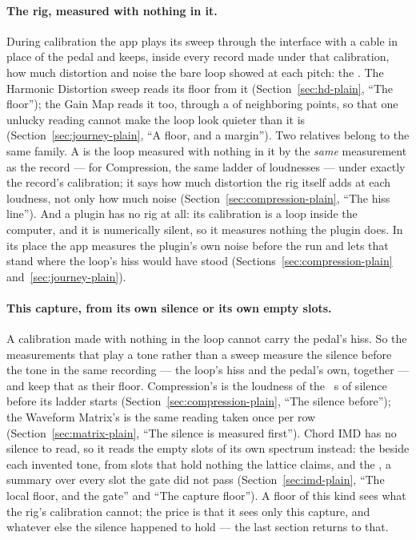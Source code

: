 \documentclass[11pt,a4paper]{article}
\begin{document}
\paragraph{The rig, measured with nothing in it.} During calibration the
app plays its sweep through the interface with a cable in place of the
pedal and keeps, inside every record made under that calibration, how much
distortion and noise the bare loop showed at each pitch: the
. The Harmonic Distortion sweep reads its floor from it
(Section~\ref{sec:hd-plain}, ``The floor''); the Gain Map reads it too,
through a  of \gmStampMedianPoints{} neighboring
points, so that one unlucky reading cannot make the loop look quieter
than it is (Section~\ref{sec:journey-plain}, ``A floor, and a margin'').
Two relatives belong to the same family. A  is
the loop measured with nothing in it by the \emph{same} measurement as
the record --- for Compression, the same ladder of loudnesses --- under
exactly the record's calibration; it says how much distortion the rig
itself adds at each loudness, not only how much noise
(Section~\ref{sec:compression-plain}, ``The hiss line''). And a plugin
has no rig at all: its calibration is a loop inside the computer, and it
is numerically silent, so it measures nothing the plugin does. In its
place the app measures the plugin's own noise before the run and lets
that  stand where the loop's hiss would have stood
(Sections~\ref{sec:compression-plain} and~\ref{sec:journey-plain}).

\paragraph{This capture, from its own silence or its own empty slots.}
A calibration made with nothing in the loop cannot carry the pedal's
hiss. So the measurements that play a tone rather than a sweep measure
the silence before the tone in the same recording --- the loop's hiss
and the pedal's own, together --- and keep that as their floor.
Compression's  is the loudness of the
\cmpPrerollS{}~s of silence before its ladder starts
(Section~\ref{sec:compression-plain}, ``The silence before''); the
Waveform Matrix's  is the same reading taken once
per row (Section~\ref{sec:matrix-plain}, ``The silence is measured
first''). Chord IMD has no silence to read, so it reads the empty slots
of its own spectrum instead: the  beside each invented
tone, from slots that hold nothing the lattice claims, and the
, a summary over every slot the gate did not pass
(Section~\ref{sec:imd-plain}, ``The local floor, and the gate'' and
``The capture floor''). A floor of this kind sees what the rig's
calibration cannot; the price is that it sees only this capture, and
whatever else the silence happened to hold --- the last section returns
to that.
\end{document}
